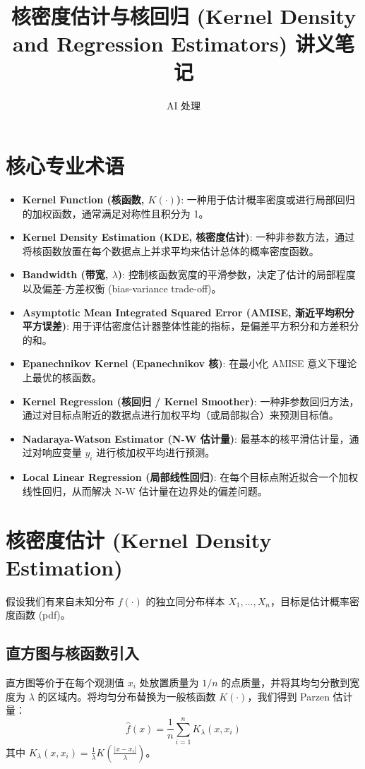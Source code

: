 \documentclass[UTF8]{ctexart}
\title{核密度估计与核回归 (Kernel Density and Regression Estimators) 讲义笔记}
\author{AI 处理}
\date{}
\begin{document}
\maketitle

\section{核心专业术语}
\begin{itemize}
    \item \textbf{Kernel Function (核函数, $K(\cdot)$)}: 一种用于估计概率密度或进行局部回归的加权函数，通常满足对称性且积分为 1。
    \item \textbf{Kernel Density Estimation (KDE, 核密度估计)}: 一种非参数方法，通过将核函数放置在每个数据点上并求平均来估计总体的概率密度函数。
    \item \textbf{Bandwidth (带宽, $\lambda$)}: 控制核函数宽度的平滑参数，决定了估计的局部程度以及偏差-方差权衡 (bias-variance trade-off)。
    \item \textbf{Asymptotic Mean Integrated Squared Error (AMISE, 渐近平均积分平方误差)}: 用于评估密度估计器整体性能的指标，是偏差平方积分和方差积分的和。
    \item \textbf{Epanechnikov Kernel (Epanechnikov 核)}: 在最小化 AMISE 意义下理论上最优的核函数。
    \item \textbf{Kernel Regression (核回归 / Kernel Smoother)}: 一种非参数回归方法，通过对目标点附近的数据点进行加权平均（或局部拟合）来预测目标值。
    \item \textbf{Nadaraya-Watson Estimator (N-W 估计量)}: 最基本的核平滑估计量，通过对响应变量 $y_i$ 进行核加权平均进行预测。
    \item \textbf{Local Linear Regression (局部线性回归)}: 在每个目标点附近拟合一个加权线性回归，从而解决 N-W 估计量在边界处的偏差问题。
\end{itemize}

\section{核密度估计 (Kernel Density Estimation)}
假设我们有来自未知分布 $f(\cdot)$ 的独立同分布样本 $X_1, \ldots, X_n$，目标是估计概率密度函数 (pdf)。

\subsection{直方图与核函数引入}
直方图等价于在每个观测值 $x_i$ 处放置质量为 $1/n$ 的点质量，并将其均匀分散到宽度为 $\lambda$ 的区域内。将均匀分布替换为一般核函数 $K(\cdot)$，我们得到 Parzen 估计量：
$$ \hat{f}(x) = \frac{1}{n} \sum_{i=1}^n K_\lambda(x, x_i) $$
其中 $K_\lambda(x, x_i) = \frac{1}{\lambda} K\left(\frac{|x - x_i|}{\lambda}\right)$。
\end{document}
